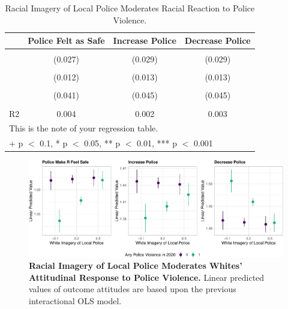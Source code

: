 \documentclass[
  11pt,
]{article}
\begin{document}
\hypertarget{tbl-reaction}{}
\begin{table}
\caption{\label{tbl-reaction}Racial Imagery of Local Police Moderates Racial Reaction to Police
Violence. }\tabularnewline

\centering
\begin{tabular}[t]{lccc}
\toprule
  & Police Felt as Safe & Increase Police & Decrease Police\\
\midrule
\cellcolor{gray!6}{White Imagery of Police} & \cellcolor{gray!6}{0.009} & \cellcolor{gray!6}{-0.009} & \cellcolor{gray!6}{-0.014}\\
 & (0.027) & (0.029) & (0.029)\\
\cellcolor{gray!6}{Any Police Violence in 2020} & \cellcolor{gray!6}{-0.070***} & \cellcolor{gray!6}{-0.057***} & \cellcolor{gray!6}{0.074***}\\
 & (0.012) & (0.013) & (0.013)\\
\cellcolor{gray!6}{Police Violence × White Imagery} & \cellcolor{gray!6}{0.130**} & \cellcolor{gray!6}{0.078+} & \cellcolor{gray!6}{-0.142**}\\
 & (0.041) & (0.045) & (0.045)\\
\midrule
\cellcolor{gray!6}{Num.Obs.} & \cellcolor{gray!6}{26016} & \cellcolor{gray!6}{26039} & \cellcolor{gray!6}{26036}\\
R2 & 0.004 & 0.002 & 0.003\\
\bottomrule
\multicolumn{4}{l}{\rule{0pt}{1em}This is the note of your regression table.}\\
\multicolumn{4}{l}{\rule{0pt}{1em}+ p $<$ 0.1, * p $<$ 0.05, ** p $<$ 0.01, *** p $<$ 0.001}\\
\end{tabular}
\end{table}

\begin{figure}[t]

{\centering \includegraphics{paper_files/figure-pdf/fig-reaction-mod-1.pdf}

}

\caption{\label{fig-reaction-mod}\textbf{Racial Imagery of Local Police
Moderates Whites' Attitudinal Response to Police Violence.} Linear
predicted values of outcome attitudes are based upon the previous
interactional OLS model.}

\end{figure}
\end{document}
